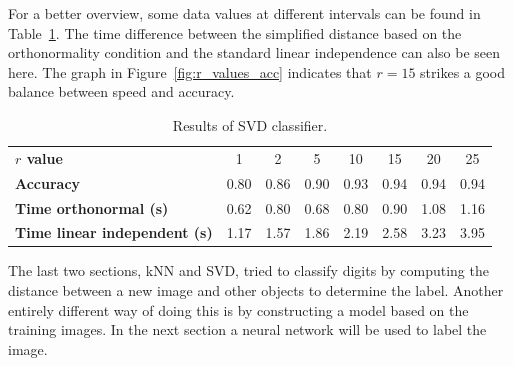 For a better overview, some data values at different intervals can be found in Table~\ref{tab:svd_all}.
The time difference between the simplified distance based on the orthonormality condition and the standard linear independence can also be seen here.
The graph in Figure~\ref{fig:r_values_acc} indicates that \(r = 15\) strikes a good balance between speed and accuracy.

\begin{table}[H]
    \centering
    \caption{Results of SVD classifier.}\label{tab:svd_all}
    \begin{tabular}{lccccccc}
        \toprule
        \textbf{\(r\) value} & 1    & 2    & 5    & 10   & 15   & 20   & 25   \\
        \textbf{Accuracy}    & 0.80 & 0.86 & 0.90 & 0.93 & 0.94 & 0.94 & 0.94 \\
        \textbf{Time orthonormal (s)}    & 0.62 & 0.80 & 0.68 & 0.80 & 0.90 & 1.08 & 1.16 \\
        \textbf{Time linear independent (s)}    & 1.17 & 1.57 & 1.86 & 2.19 & 2.58 & 3.23 & 3.95 \\
        \bottomrule
    \end{tabular}
\end{table}

The last two sections, kNN and SVD, tried to classify digits by computing the distance between a new image and other objects to determine the label.
Another entirely different way of doing this is by constructing a model based on the training images.
In the next section a neural network will be used to label the image.
